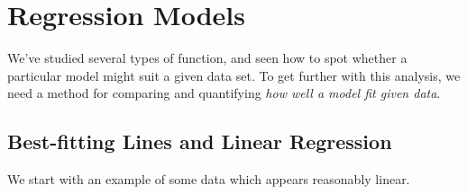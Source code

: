 \graphicspath{{5regression/asy/}}

\section{Regression Models}

We've studied several types of function, and seen how to spot whether a particular model might suit a given data set. To get further with this analysis, we need a method for comparing and quantifying \emph{how well a model fit given data}.

\subsection{Best-fitting Lines and Linear Regression}\label{sec:reg1}

We start with an example of some data which appears reasonably linear.

